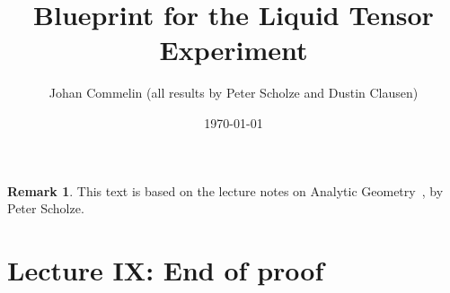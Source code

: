 \documentclass[11pt]{amsart}
\date{\today}
\title{Blueprint for the Liquid Tensor Experiment}
\author{Johan Commelin (all results by Peter Scholze and Dustin Clausen)}
\DeclareMathOperator{\Hom}{Hom}
\numberwithin{equation}{section}
\newtheorem{theorem}{Theorem}
\numberwithin{theorem}{section}
\theoremstyle{definition}
\newtheorem{remark}[theorem]{Remark}
\begin{document}
\maketitle

\begin{remark}
	This text is based on the lecture notes on Analytic Geometry~\cite{Analytic},
	by Peter Scholze.
\end{remark}

\section{Lecture IX: End of proof}




\end{document}
